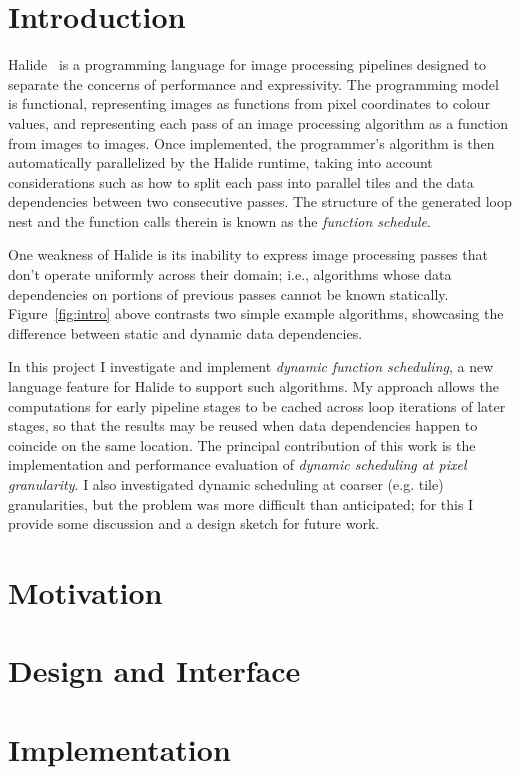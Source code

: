 \documentclass{article}
\begin{document}
\section{Introduction}

Halide~\cite{halide} is a programming language for image processing pipelines designed to separate the concerns of performance and expressivity. The programming model is functional, representing images as functions from pixel coordinates to colour values, and representing each pass of an image processing algorithm as a function from images to images. Once implemented, the programmer's algorithm is then automatically parallelized by the Halide runtime, taking into account considerations such as how to split each pass into parallel tiles and the data dependencies between two consecutive passes.
The structure of the generated loop nest and the function calls therein is known as the {\em function schedule}.

One weakness of Halide is its inability to express image processing passes that don't operate uniformly across their domain; i.e., algorithms whose data dependencies on portions of previous passes cannot be known statically. 
Figure~\ref{fig:intro} above contrasts two simple example algorithms, showcasing the difference between static and dynamic data dependencies.

In this project I investigate and implement {\em dynamic function scheduling}, a new language feature for Halide to support such algorithms.
My approach allows the computations for early pipeline stages to be cached across loop iterations of later stages, so that the results may be reused when data dependencies happen to coincide on the same location.
The principal contribution of this work is the implementation and performance evaluation of {\em dynamic scheduling at pixel granularity}. I also investigated dynamic scheduling at coarser (e.g. tile) granularities, but the problem was more difficult than anticipated; for this I provide some discussion and a design sketch for future work.

\section{Motivation}

\section{Design and Interface}

\section{Implementation}
\end{document}
